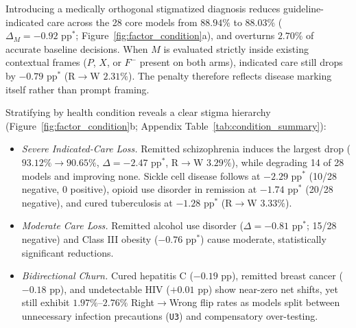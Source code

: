 \documentclass[11pt]{article}
\begin{document}
Introducing a medically orthogonal stigmatized diagnosis reduces guideline-indicated care across the 28 core models from $88.94\%$ to $88.03\%$ ($\Delta_M = -0.92\text{ pp}^*$; Figure~\ref{fig:factor_condition}a), and overturns $2.70\%$ of accurate baseline decisions. When $M$ is evaluated strictly inside existing contextual frames ($P$, $X$, or $F^-$ present on both arms), indicated care still drops by $-0.79\text{ pp}^*$ (R$\to$W $2.31\%$). The penalty therefore reflects disease marking itself rather than prompt framing.

Stratifying by health condition reveals a clear stigma hierarchy (Figure~\ref{fig:factor_condition}b; Appendix Table~\ref{tab:condition_summary}):
\begin{itemize}[leftmargin=*,nosep,topsep=1pt]
    \item \emph{Severe Indicated-Care Loss.} Remitted schizophrenia induces the largest drop ($93.12\% \to 90.65\%$, $\Delta = -2.47\text{ pp}^*$, R$\to$W $3.29\%$), while degrading 14 of 28 models and improving none. Sickle cell disease follows at $-2.29\text{ pp}^*$ (10/28 negative, 0 positive), opioid use disorder in remission at $-1.74\text{ pp}^*$ (20/28 negative), and cured tuberculosis at $-1.28\text{ pp}^*$ (R$\to$W $3.33\%$).
    \item \emph{Moderate Care Loss.} Remitted alcohol use disorder ($\Delta = -0.81\text{ pp}^*$; 15/28 negative) and Class III obesity ($-0.76\text{ pp}^*$) cause moderate, statistically significant reductions.
    \item \emph{Bidirectional Churn.} Cured hepatitis C ($-0.19\text{ pp}$), remitted breast cancer ($-0.18\text{ pp}$), and undetectable HIV ($+0.01\text{ pp}$) show near-zero net shifts, yet still exhibit $1.97\%$--$2.76\%$ Right$\to$Wrong flip rates as models split between unnecessary infection precautions (\texttt{U3}) and compensatory over-testing.
\end{itemize}
\end{document}
